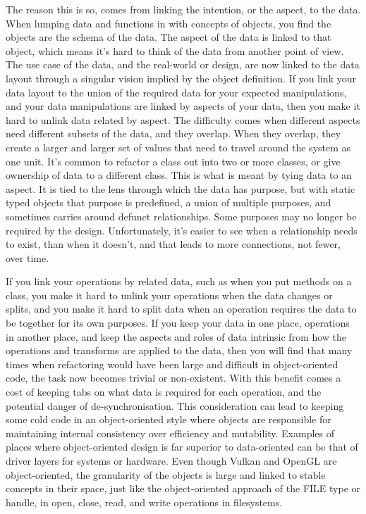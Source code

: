 \documentclass[a4paper,12pt]{article}
\begin{document}
The reason this is so, comes from linking the intention, or the aspect, to the data.
When lumping data and functions in with concepts of objects, you find the objects are the schema of the data.
The aspect of the data is linked to that object, which means it's hard to think of the data from another point of view.
The use case of the data, and the real-world or design, are now linked to the data layout through a singular vision implied by the object definition.
If you link your data layout to the union of the required data for your expected manipulations, and your data manipulations are linked by aspects of your data, then you make it hard to unlink data related by aspect.
The difficulty comes when different aspects need different subsets of the data, and they overlap.
When they overlap, they create a larger and larger set of values that need to travel around the system as one unit.
It's common to refactor a class out into two or more classes, or give ownership of data to a different class.
This is what is meant by tying data to an aspect.
It is tied to the lens through which the data has purpose, but with static typed objects that purpose is predefined, a union of multiple purposes, and sometimes carries around defunct relationships.
Some purposes may no longer be required by the design.
Unfortunately, it's easier to see when a relationship needs to exist, than when it doesn't, and that leads to more connections, not fewer, over time.

If you link your operations by related data, such as when you put methods on a class, you make it hard to unlink your operations when the data changes or splits, and you make it hard to split data when an operation requires the data to be together for its own purposes.
If you keep your data in one place, operations in another place, and keep the aspects and roles of data intrinsic from how the operations and transforms are applied to the data, then you will find that many times when refactoring would have been large and difficult in object-oriented code, the task now becomes trivial or non-existent.
With this benefit comes a cost of keeping tabs on what data is required for each operation, and the potential danger of de-synchronisation.
This consideration can lead to keeping some cold code in an object-oriented style where objects are responsible for maintaining internal consistency over efficiency and mutability.
Examples of places where object-oriented design is far superior to data-oriented can be that of driver layers for systems or hardware.
Even though Vulkan and OpenGL are object-oriented, the granularity of the objects is large and linked to stable concepts in their space, just like the object-oriented approach of the FILE type or handle, in open, close, read, and write operations in filesystems.
\end{document}
